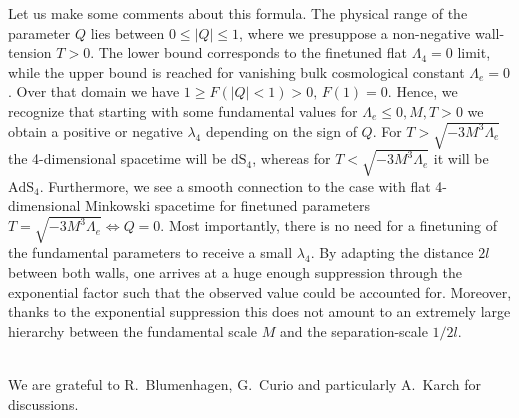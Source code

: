 \documentclass[a4paper,12pt]{article}
\begin{document}
Let us make some comments about this formula. The physical range of
the parameter $Q$ lies between $0\le |Q|\le 1$, where we presuppose a
non-negative wall-tension $T>0$. The lower bound corresponds to the
finetuned flat $\Lambda_4=0$ limit, while the upper bound is reached
for vanishing bulk cosmological constant $\Lambda_e=0$. Over that
domain we have $1
\ge F(|Q|<1)>0,\,F(1)=0$. Hence, we recognize that starting with some
fundamental values for $\Lambda_e\le 0,M,T>0$ we obtain a positive or
negative $\lambda_4$ depending on the sign of $Q$. For
$T>\sqrt{-3M^3\Lambda_e}$ the 4-dimensional spacetime will be
$\text{dS}_4$, whereas for $T<\sqrt{-3M^3\Lambda_e}$ it will be
$\text{AdS}_4$. Furthermore, we see a smooth connection to the case
with flat 4-dimensional Minkowski spacetime for finetuned parameters
$T=\sqrt{-3M^3\Lambda_e} \Leftrightarrow Q=0$.  Most importantly,
there is no need for a finetuning of the fundamental parameters to
receive a small $\lambda_4$. By adapting the distance $2l$ between
both walls, one arrives at a huge enough suppression through the
exponential factor such that the observed value could be accounted
for. Moreover, thanks to the exponential suppression this does not
amount to an extremely large hierarchy between the fundamental scale
$M$ and the separation-scale $1/2l$.


\bigskip
{}\\[2ex] 
We are grateful to R.~Blumenhagen, G.~Curio and particularly A.~Karch for
discussions.
\end{document}
